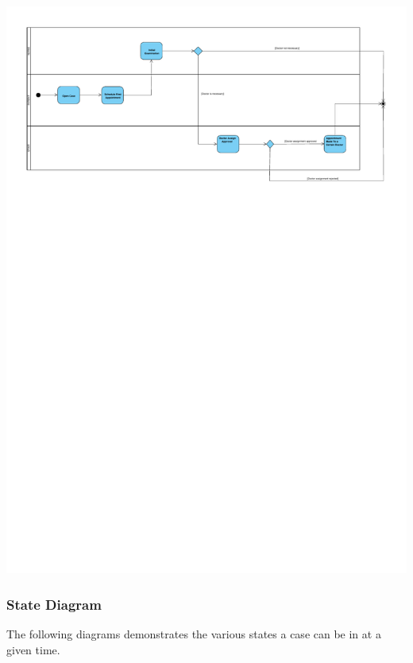 \documentclass[a4paper, 12pt, titlepage]{article}
\begin{document}
  \includegraphics[width=\linewidth]{activity_diag_appointment}

  \subsubsection{State Diagram}

  The following diagrams demonstrates the various states a case can be in at a given time.
\end{document}
